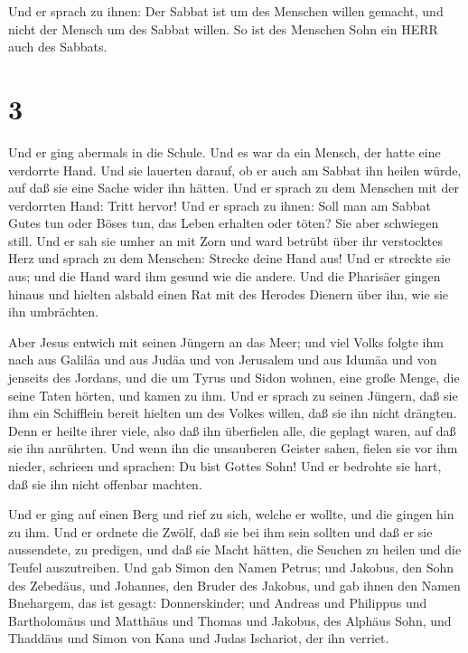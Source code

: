  Und er sprach zu ihnen: Der Sabbat ist um des Menschen
willen gemacht, und nicht der Mensch um des Sabbat willen. 
So ist des Menschen Sohn ein HERR auch des Sabbats.

\hypertarget{section-2}{%
\section{3}\label{section-2}}

 Und er ging abermals in die Schule. Und es war da ein
Mensch, der hatte eine verdorrte Hand.  Und sie lauerten
darauf, ob er auch am Sabbat ihn heilen würde, auf daß sie eine Sache
wider ihn hätten.  Und er sprach zu dem Menschen mit der
verdorrten Hand: Tritt hervor!  Und er sprach zu ihnen: Soll
man am Sabbat Gutes tun oder Böses tun, das Leben erhalten oder töten?
Sie aber schwiegen still.  Und er sah sie umher an mit Zorn
und ward betrübt über ihr verstocktes Herz und sprach zu dem Menschen:
Strecke deine Hand aus! Und er streckte sie aus; und die Hand ward ihm
gesund wie die andere.  Und die Pharisäer gingen hinaus und
hielten alsbald einen Rat mit des Herodes Dienern über ihn, wie sie ihn
umbrächten.

 Aber Jesus entwich mit seinen Jüngern an das Meer; und viel
Volks folgte ihm nach aus Galiläa und aus Judäa  und von
Jerusalem und aus Idumäa und von jenseits des Jordans, und die um Tyrus
und Sidon wohnen, eine große Menge, die seine Taten hörten, und kamen zu
ihm.  Und er sprach zu seinen Jüngern, daß sie ihm ein
Schifflein bereit hielten um des Volkes willen, daß sie ihn nicht
drängten.  Denn er heilte ihrer viele, also daß ihn
überfielen alle, die geplagt waren, auf daß sie ihn anrührten.
 Und wenn ihn die unsauberen Geister sahen, fielen sie vor
ihm nieder, schrieen und sprachen: Du bist Gottes Sohn! 
Und er bedrohte sie hart, daß sie ihn nicht offenbar machten.

 Und er ging auf einen Berg und rief zu sich, welche er
wollte, und die gingen hin zu ihm.  Und er ordnete die
Zwölf, daß sie bei ihm sein sollten und daß er sie aussendete, zu
predigen,  und daß sie Macht hätten, die Seuchen zu heilen
und die Teufel auszutreiben.  Und gab Simon den Namen
Petrus;  und Jakobus, den Sohn des Zebedäus, und Johannes,
den Bruder des Jakobus, und gab ihnen den Namen Bnehargem, das ist
gesagt: Donnerskinder;  und Andreas und Philippus und
Bartholomäus und Matthäus und Thomas und Jakobus, des Alphäus Sohn, und
Thaddäus und Simon von Kana  und Judas Ischariot, der ihn
verriet.

